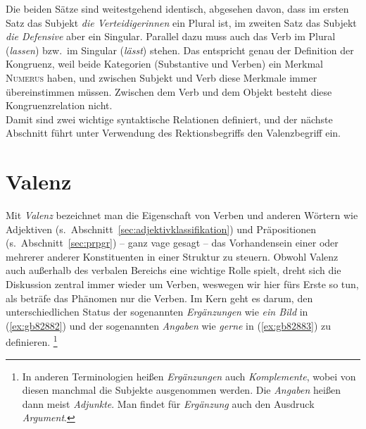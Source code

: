 Die beiden Sätze sind weitestgehend identisch, abgesehen davon, dass im ersten Satz das Subjekt \textit{die Verteidigerinnen} ein Plural ist, im zweiten Satz das Subjekt \textit{die Defensive} aber ein Singular.
Parallel dazu muss auch das Verb im Plural (\textit{lassen}) bzw.\ im Singular (\textit{lässt}) stehen.
Das entspricht genau der Definition der Kongruenz, weil beide Kategorien (Substantive und Verben) ein Merkmal \textsc{Numerus} haben, und zwischen Subjekt und Verb diese Merkmale immer übereinstimmen müssen.
Zwischen dem Verb und dem Objekt besteht diese Kongruenzrelation nicht.\\
Damit sind zwei wichtige syntaktische Relationen definiert, und der nächste Abschnitt führt unter Verwendung des Rektionsbegriffs den Valenzbegriff ein.


\section{Valenz}

\label{sec:valenz}


Mit \textit{Valenz} bezeichnet man die Eigenschaft von Verben und anderen Wörtern wie Adjektiven (s.\ Abschnitt~\ref{sec:adjektivklassifikation}) und Präpositionen (s.\ Abschnitt~\ref{sec:prpgr}) -- ganz vage gesagt -- das Vorhandensein einer oder mehrerer anderer Konstituenten in einer Struktur zu steuern.
Obwohl Valenz auch außerhalb des verbalen Bereichs eine wichtige Rolle spielt, dreht sich die Diskussion zentral immer wieder um Verben, weswegen wir hier fürs Erste so tun, als beträfe das Phänomen nur die Verben.
Im Kern geht es darum, den unterschiedlichen Status der sogenannten \textit{Ergänzungen} wie \textit{ein Bild} in (\ref{ex:gb82882}) und der sogenannten \textit{Angaben} wie \textit{gerne} in (\ref{ex:gb82883}) zu definieren.%
\footnote{In anderen Terminologien heißen \textit{Ergänzungen} auch \textit{Komplemente}, wobei von diesen manchmal die Subjekte ausgenommen werden.
Die \textit{Angaben} heißen dann meist \textit{Adjunkte}.
Man findet für \textit{Ergänzung} auch den Ausdruck \textit{Argument}.
}


